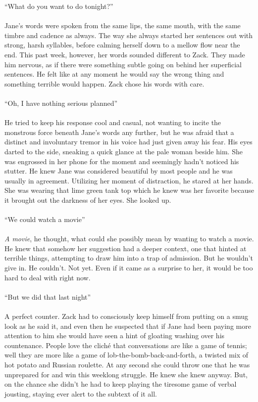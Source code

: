 “What do you want to do tonight?”
\\\\
Jane’s words were spoken from the same lips, the same mouth, with the same timbre and cadence as always. The way she always started her sentences out with strong, harsh syllables, before calming herself down to a mellow flow near the end.  This past week, however, her words sounded different to Zack. They made him nervous, as if there were something subtle going on behind her superficial sentences. He felt like at any moment he would say the wrong thing and something terrible would happen. Zack chose his words with care.
\\\\
“Oh, I have nothing serious planned”
\\\\
He tried to keep his response cool and casual, not wanting to incite the monstrous force beneath Jane’s words any further, but he was afraid that a distinct and involuntary tremor in his voice had just given away his fear. His eyes darted to the side, sneaking a quick glance at the pale woman beside him. She was engrossed in her phone for the moment and seemingly hadn’t noticed his stutter. He knew Jane was considered beautiful by most people and he was usually in agreement. Utilizing her moment of distraction, he stared at her hands. She was wearing that lime green tank top which he knew was her favorite because it brought out the darkness of her eyes. She looked up.
\\\\
“We could watch a movie”
\\\\
\textit{A movie}, he thought, what could she possibly mean by wanting to watch a movie. He knew that somehow her suggestion had a deeper context, one that hinted at terrible things, attempting to draw him into a trap of admission. But he wouldn’t give in. He couldn’t. Not yet. Even if it came as a surprise to her, it would be too hard to deal with right now. 
\\\\
“But we did that last night”
\\\\
A perfect counter. Zack had to consciously keep himself from putting on a smug look as he said it, and even then he suspected that if Jane had been paying more attention to him she would have seen a hint of gloating washing over his countenance. People love the cliché that conversations are like a game of tennis; well they are more like a game of lob-the-bomb-back-and-forth, a twisted mix of hot potato and Russian roulette. At any second she could throw one that he was unprepared for and win this weeklong struggle. He knew she knew anyway. But, on the chance she didn’t he had to keep playing the tiresome game of verbal jousting, staying ever alert to the subtext of it all.
